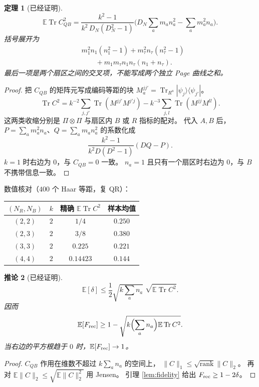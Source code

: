 \documentclass[11pt]{ctexart}
\newtheorem{theorem}{定理}
\newtheorem{corollary}[theorem]{推论}
\theoremstyle{definition}
\theoremstyle{remark}
\newcommand{\E}{\mathbb E}
\newcommand{\Tr}{\operatorname{Tr}}
\begin{document}
\begin{theorem}[已经证明]
\label{thm:c2}
\[
\E\Tr C_{QB}^2
=\frac{k^2-1}{k^2\,D_N(D_N^2-1)}
\Biggl(D_N\sum_a m_an_a^2-\sum_a m_a^2 n_a\Biggr).
\]
括号展开为
\begin{align*}
&m_1^2 n_1(n_1^2-1)+m_\tau^2 n_\tau(n_\tau^2-1)\\
&\qquad+m_1m_\tau n_1 n_\tau(n_1+n_\tau).
\end{align*}
最后一项是两个扇区之间的交叉项，不能写成两个独立 Page 曲线之和。
\end{theorem}

\begin{proof}
把 $C_{QB}$ 的矩阵元写成编码等距的块 $M_a^{jj'}=\Tr_{R^a}|\psi_j\rangle\langle\psi_{j'}|$。
\[
\Tr C^2
=k^{-2}\sum_{j,j'}\Tr(M^{jj'}M^{j'j})
-k^{-3}\sum_{j,l}\Tr(M^{jj}M^{ll}).
\]
这两类收缩分别是 $\Pi\otimes\Pi$ 与扇区内 $B$ 或 $R$ 指标的配对。
代入 $A,B$ 后，$P=\sum_a m_a^2 n_a$、$Q=\sum_a m_a n_a^2$ 的系数化成
\[
\frac{k^2-1}{k^2 D(D^2-1)}(DQ-P).
\]
$k=1$ 时右边为 $0$，与 $C_{QB}=0$ 一致。
$n_a=1$ 且只有一个扇区时右边为 $0$，与 $B$ 不携带信息一致。
\end{proof}

数值核对（$400$ 个 Haar 等距，复 QR）：

\begin{center}
\begin{tabular}{cccc}
\toprule
$(N_R,N_B)$ & $k$ & 精确 $\E\Tr C^2$ & 样本均值 \\
\midrule
$(2,2)$ & $2$ & $1/4$ & $0.250$ \\
$(2,3)$ & $2$ & $3/8$ & $0.380$ \\
$(3,3)$ & $2$ & $0.225$ & $0.221$ \\
$(4,4)$ & $2$ & $0.14423$ & $0.144$ \\
\bottomrule
\end{tabular}
\end{center}

\begin{corollary}[已经证明]
\label{cor:recover}
\[
\E[\delta]
\le\frac12\sqrt{k\sum_a n_a}\;\sqrt{\E\Tr C^2}.
\]
因而
\[
\E[F_{\rm rec}]\ge 1-\sqrt{k\Bigl(\sum_a n_a\Bigr)\E\Tr C^2}.
\]
当右边的平方根趋于 $0$ 时，$\E[F_{\rm rec}]\to 1$。
\end{corollary}

\begin{proof}
$C_{QB}$ 作用在维数不超过 $k\sum_a n_a$ 的空间上，
$\|C\|_1\le\sqrt{\operatorname{rank}}\|C\|_2$。
再对 $\E\|C\|_2\le\sqrt{\E\|C\|_2^2}$ 用 Jensen。
引理 \ref{lem:fidelity} 给出 $F_{\rm rec}\ge 1-2\delta$。
\end{proof}
\end{document}
